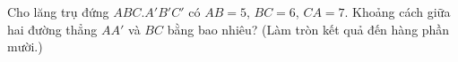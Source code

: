 \begin{ex}
Cho lăng trụ đứng $ABC.A'B'C'$ có $AB=5$, $BC=6$, $CA=7$. Khoảng cách giữa hai đường thẳng $AA'$ và $BC$ bằng bao nhiêu? (Làm tròn kết quả đến hàng phần mười.)
\end{ex}
